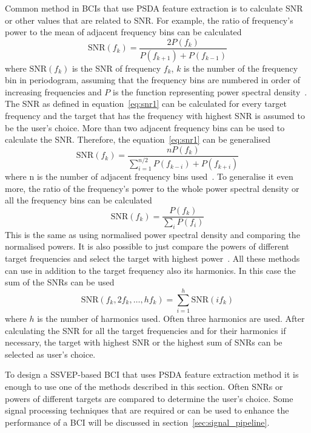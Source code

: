 Common method in \glspl{BCI} that use \gls{PSDA} \gls{feature extraction} is to calculate \gls{SNR} or other values that are related to \gls{SNR}. For example, the ratio of frequency's power to the mean of adjacent frequency bins can be calculated
\begin{equation}
	\label{eq:snr1}
	\mbox{SNR}(f_k) = \frac{2P(f_k)}{P(f_{k+1})+P(f_{k-1})}
\end{equation}
where $\mbox{SNR}(f_k)$ is the \gls{SNR} of frequency $f_k$, $k$ is the number of the \gls{frequency bin} in \gls{periodogram}, assuming that the \glspl{frequency bin} are numbered in order of increasing frequencies and $P$ is the function representing \gls{power spectral density}~\cite{psda_snr1}. The \gls{SNR} as defined in equation~\ref{eq:snr1} can be calculated for every \gls{target} frequency and the \gls{target} that has the frequency with highest \gls{SNR} is assumed to be the user's choice. More than two adjacent frequency bins can be used to calculate the \gls{SNR}. Therefore, the equation~\ref{eq:snr1} can be generalised
\begin{equation}
	\mbox{SNR}(f_k) = \frac{nP(f_k)}{\sum_{i=1}^{n/2}P(f_{k-i})+P(f_{k+i})}
\end{equation}
where n is the number of adjacent frequency bins used~\cite{psda_snr2}. To generalise it even more, the ratio of the frequency's power to the whole \gls{power spectral density} or all the \glspl{frequency bin} can be calculated
\begin{equation}
	\mbox{SNR}(f_k) = \frac{P(f_k)}{\sum_i P(f_i)}
\end{equation}
This is the same as using normalised \gls{power spectral density} and comparing the normalised powers. It is also possible to just compare the powers of different \gls{target} frequencies and select the \gls{target} with highest power~\cite{cca_psda}. All these methods can use in addition to the \gls{target} frequency also its \glspl{harmonic}. In this case the sum of the \glspl{SNR} can be used
\begin{equation}
	\mbox{SNR}(f_k, 2f_k, \dots, hf_k)=\sum_{i=1}^{h}\mbox{SNR}(if_k)
\end{equation}
where $h$ is the number of \glspl{harmonic} used. Often three \glspl{harmonic} are used. After calculating the \gls{SNR} for all the \gls{target} frequencies and for their \glspl{harmonic} if necessary, the \gls{target} with highest \gls{SNR} or the highest sum of \glspl{SNR} can be selected as user's choice.

To design a \gls{SSVEP}-based \gls{BCI} that uses \gls{PSDA} \gls{feature extraction} method it is enough to use one of the methods described in this section. Often \glspl{SNR} or powers of different \glspl{target} are compared to determine the user's choice. Some signal processing techniques that are required or can be used to enhance the performance of a \gls{BCI} will be discussed in section~\ref{sec:signal_pipeline}.

